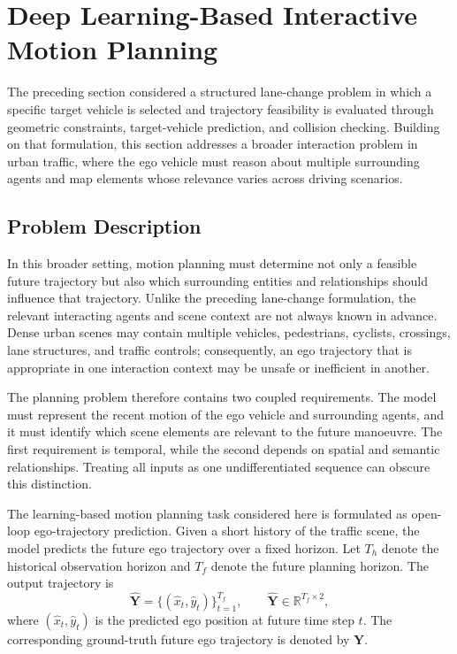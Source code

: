 \section{Deep Learning-Based Interactive Motion Planning}
\label{sec:xiao_magnet_motion_planning}

The preceding section considered a structured lane-change problem in which a specific target vehicle is selected and trajectory feasibility is evaluated through geometric constraints, target-vehicle prediction, and collision checking. Building on that formulation, this section addresses a broader interaction problem in urban traffic, where the ego vehicle must reason about multiple surrounding agents and map elements whose relevance varies across driving scenarios.

\subsection{Problem Description}
\label{subsec:magnet_problem}

In this broader setting, motion planning must determine not only a feasible future trajectory but also which surrounding entities and relationships should influence that trajectory. Unlike the preceding lane-change formulation, the relevant interacting agents and scene context are not always known in advance. Dense urban scenes may contain multiple vehicles, pedestrians, cyclists, crossings, lane structures, and traffic controls; consequently, an ego trajectory that is appropriate in one interaction context may be unsafe or inefficient in another.

The planning problem therefore contains two coupled requirements. The model must represent the recent motion of the ego vehicle and surrounding agents, and it must identify which scene elements are relevant to the future manoeuvre. The first requirement is temporal, while the second depends on spatial and semantic relationships. Treating all inputs as one undifferentiated sequence can obscure this distinction.

The learning-based motion planning task considered here is formulated as open-loop ego-trajectory prediction. Given a short history of the traffic scene, the model predicts the future ego trajectory over a fixed horizon. Let \(T_h\) denote the historical observation horizon and \(T_f\) denote the future planning horizon. The output trajectory is
\begin{equation}
    \hat{\mathbf{Y}} =
    \{(\hat{x}_t,\hat{y}_t)\}_{t=1}^{T_f},
    \qquad
    \hat{\mathbf{Y}}\in\mathbb{R}^{T_f\times 2},
    \label{eq:chapter_traj_output}
\end{equation}
where \((\hat{x}_t,\hat{y}_t)\) is the predicted ego position at future time step \(t\). The corresponding ground-truth future ego trajectory is denoted by \(\mathbf{Y}\).

